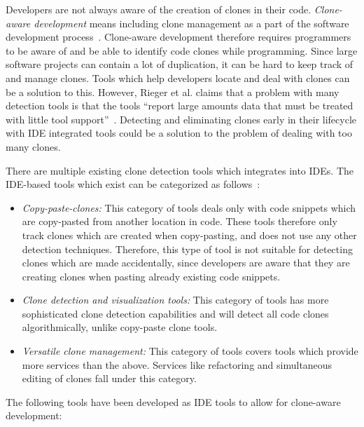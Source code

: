 Developers are not always aware of the creation of clones in their code. \emph{Clone-aware
development} means including clone management as a part of the software development
process~\cite{Zibran_real_time_search}. Clone-aware development therefore requires
programmers to be aware of and be able to identify code clones while programming. Since
large software projects can contain a lot of duplication, it can be hard to keep track of
and manage clones. Tools which help developers locate and deal with clones can be a
solution to this. However, Rieger et al. claims that a problem with many detection
tools is that the tools ``report large amounts data that must be treated with little tool
support''~\cite[1]{InsightsSystemWideDuplication}. Detecting and eliminating clones early
in their lifecycle with IDE integrated tools could be a solution to the problem of dealing
with too many clones.

There are multiple existing clone detection tools which integrates into IDEs. The
IDE-based tools which exist can be categorized as
follows~\cite[8]{Udding_Towards_Convenient_Management}:

\begin{itemize}
	\item\textit{Copy-paste-clones:} This category of tools deals only with code snippets which are
	copy-pasted from another location in code. These tools therefore only track clones which
	are created when copy-pasting, and does not use any other detection techniques. Therefore,
	this type of tool is not suitable for detecting clones which are made accidentally, since
	developers are aware that they are creating clones when pasting already existing code
	snippets.

    \item\textit{Clone detection and visualization tools:} This category of tools has more
        sophisticated clone detection capabilities and will detect all code clones
        algorithmically, unlike copy-paste clone tools.

    \item\textit{Versatile clone management:} This category of tools covers tools which
        provide more services than the above. Services like refactoring and simultaneous
        editing of clones fall under this category.

\end{itemize}

The following tools have been developed as IDE tools to allow for clone-aware development:


